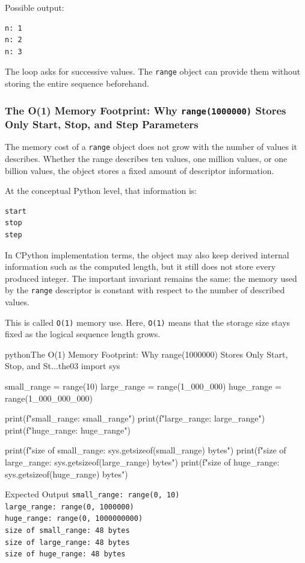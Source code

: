 Possible output:

\begin{verbatim}
n: 1
n: 2
n: 3
\end{verbatim}

The loop asks for successive values. The \texttt{range} object can provide them without storing the entire sequence beforehand.

\subsubsection{The O(1) Memory Footprint: Why \texttt{range(1000000)} Stores Only Start, Stop, and Step Parameters}

The memory cost of a \texttt{range} object does not grow with the number of values it describes. Whether the range describes ten values, one million values, or one billion values, the object stores a fixed amount of descriptor information.

At the conceptual Python level, that information is:

\begin{verbatim}
start
stop
step
\end{verbatim}

In CPython implementation terms, the object may also keep derived internal information such as the computed length, but it still does not store every produced integer. The important invariant remains the same: the memory used by the \texttt{range} descriptor is constant with respect to the number of described values.

This is called \texttt{O(1)} memory use. Here, \texttt{O(1)} means that the storage size stays fixed as the logical sequence length grows.

\begin{codebox}[]{python}{The O(1) Memory Footprint: Why range(1000000) Stores Only Start, Stop, and St...}{the03}
import sys

small_range = range(10)
large_range = range(1_000_000)
huge_range = range(1_000_000_000)

print(f"small_range: {small_range}")
print(f"large_range: {large_range}")
print(f"huge_range:  {huge_range}")

print(f"size of small_range: {sys.getsizeof(small_range)} bytes")
print(f"size of large_range: {sys.getsizeof(large_range)} bytes")
print(f"size of huge_range:  {sys.getsizeof(huge_range)} bytes")
\end{codebox}


\begin{iobox}{Expected Output}
\texttt{small\_range: range(0, 10)} \\
\texttt{large\_range: range(0, 1000000)} \\
\texttt{huge\_range:  range(0, 1000000000)} \\
\texttt{size of small\_range: 48 bytes} \\
\texttt{size of large\_range: 48 bytes} \\
\texttt{size of huge\_range:  48 bytes} \\
\end{iobox}


